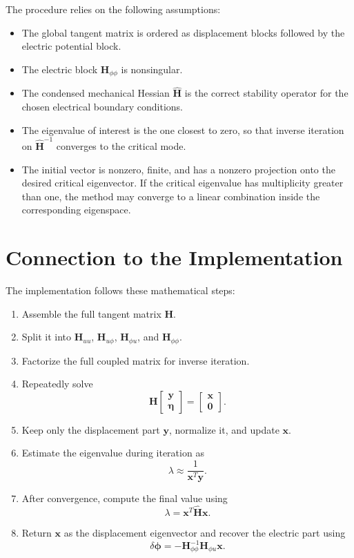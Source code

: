 \documentclass[11pt]{article}
\begin{document}
The procedure relies on the following assumptions:
\begin{itemize}
    \item The global tangent matrix is ordered as displacement blocks
          followed by the electric potential block.
    \item The electric block \(\bm H_{\phi\phi}\) is nonsingular.
    \item The condensed mechanical Hessian
          \(\widehat{\bm H}\) is the correct stability operator for the
          chosen electrical boundary conditions.
    \item The eigenvalue of interest is the one closest to zero, so that
          inverse iteration on \(\widehat{\bm H}^{-1}\) converges to the
          critical mode.
    \item The initial vector is nonzero, finite, and has a nonzero
          projection onto the desired critical eigenvector. If the
          critical eigenvalue has multiplicity greater than one, the
          method may converge to a linear combination inside the
          corresponding eigenspace.
\end{itemize}

\section{Connection to the Implementation}

The implementation follows these mathematical steps:
\begin{enumerate}
    \item Assemble the full tangent matrix \(\bm H\).
    \item Split it into
          \(\bm H_{uu}\), \(\bm H_{u\phi}\),
          \(\bm H_{\phi u}\), and \(\bm H_{\phi\phi}\).
    \item Factorize the full coupled matrix for inverse iteration.
    \item Repeatedly solve
          \[
              \bm H
              \begin{bmatrix}
                  \bm y \\
                  \bm \eta
              \end{bmatrix}
              =
              \begin{bmatrix}
                  \bm x \\
                  \bm 0
              \end{bmatrix}.
          \]
    \item Keep only the displacement part \(\bm y\), normalize it, and
          update \(\bm x\).
    \item Estimate the eigenvalue during iteration as
          \[
              \lambda \approx \frac{1}{\bm x^T\bm y}.
          \]
    \item After convergence, compute the final value using
          \[
              \lambda = \bm x^T\widehat{\bm H}\bm x.
          \]
    \item Return \(\bm x\) as the displacement eigenvector and recover
          the electric part using
          \[
              \delta\bm\phi
              =
              -\bm H_{\phi\phi}^{-1}\bm H_{\phi u}\bm x.
          \]
\end{enumerate}
\end{document}
